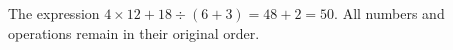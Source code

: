 The expression $\boxed{4\times12+18\div(6+3)}=48+2=50$. All numbers and operations remain in their original order.
